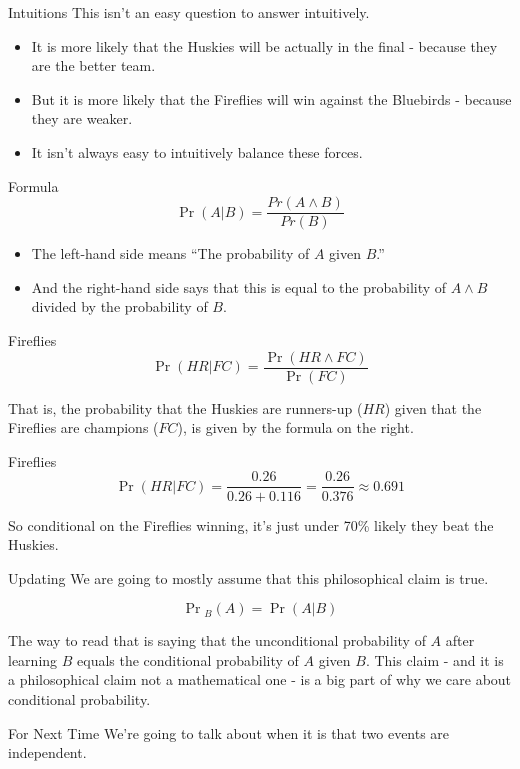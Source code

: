 \documentclass[
  ignorenonframetext,
]{beamer}
\providecommand{\tightlist}{%
  \setlength{\itemsep}{0pt}\setlength{\parskip}{0pt}}
\begin{document}
\begin{frame}{Intuitions}
\protect\hypertarget{intuitions}{}
This isn't an easy question to answer intuitively.

\begin{itemize}
\tightlist
\item
  It is more likely that the Huskies will be actually in the final -
  because they are the better team.
\item
  But it is more likely that the Fireflies will win against the
  Bluebirds - because they are weaker.
\item
  It isn't always easy to intuitively balance these forces.
\end{itemize}
\end{frame}

\begin{frame}{Formula}
\protect\hypertarget{formula}{}
\[
\Pr(A | B) = \frac{Pr(A \wedge B)}{Pr(B)}
\]

\pause

\begin{itemize}
\tightlist
\item
  The left-hand side means ``The probability of \(A\) given \(B\).''
  \pause
\item
  And the right-hand side says that this is equal to the probability of
  \(A \wedge B\) divided by the probability of \(B\).
\end{itemize}
\end{frame}

\begin{frame}{Fireflies}
\protect\hypertarget{fireflies}{}
\[
\Pr(HR | FC) = \frac{\Pr(HR \wedge FC)}{\Pr(FC)}
\]

That is, the probability that the Huskies are runners-up (\(HR\)) given
that the Fireflies are champions (\(FC\)), is given by the formula on
the right.
\end{frame}

\begin{frame}{Fireflies}
\protect\hypertarget{fireflies-1}{}
\[
\Pr(HR | FC) = \frac{0.26}{0.26+0.116} = \frac{0.26}{0.376} \approx 0.691
\]

So conditional on the Fireflies winning, it's just under 70\% likely
they beat the Huskies.
\end{frame}

\begin{frame}{Updating}
\protect\hypertarget{updating}{}
We are going to mostly assume that this philosophical claim is true.

\[
\Pr{}_B(A) = \Pr(A | B)
\]

The way to read that is saying that the unconditional probability of
\(A\) after learning \(B\) equals the conditional probability of \(A\)
given \(B\). This claim - and it is a philosophical claim not a
mathematical one - is a big part of why we care about conditional
probability.
\end{frame}

\begin{frame}{For Next Time}
\protect\hypertarget{for-next-time}{}
We're going to talk about when it is that two events are independent.
\end{frame}
\end{document}
